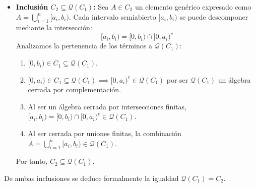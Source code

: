 \begin{problema}
\begin{enumerate}[label=\alph*)]
\begin{itemize}
        \item \textbf{Inclusión $C_2 \subseteq \mathcal{Q}(C_1)$:}
        Sea $A \in C_2$ un elemento genérico expresado como $A = \bigcup_{i=1}^n [a_i, b_i)$.
        Cada intervalo semiabierto $[a_i, b_i)$ se puede descomponer mediante la intersección:
        \[
            [a_i, b_i) = [0, b_i) \cap [0, a_i)^c
        \]
        Analizamos la pertenencia de los términos a $\mathcal{Q}(C_1)$:
        \begin{enumerate}[label=\arabic*)]
            \item $[0, b_i) \in C_1 \subseteq \mathcal{Q}(C_1)$.
            \item $[0, a_i) \in C_1 \subseteq \mathcal{Q}(C_1) \implies [0, a_i)^c \in \mathcal{Q}(C_1)$ por ser $\mathcal{Q}(C_1)$ un álgebra cerrada por complementación.
            \item Al ser un álgebra cerrada por intersecciones finitas, $[a_i, b_i) = [0, b_i) \cap [0, a_i)^c \in \mathcal{Q}(C_1)$.
            \item Al ser cerrada por uniones finitas, la combinación $A = \bigcup_{i=1}^n [a_i, b_i) \in \mathcal{Q}(C_1)$.
        \end{enumerate}
        Por tanto, $C_2 \subseteq \mathcal{Q}(C_1)$.
    \end{itemize}
    De ambas inclusiones se deduce formalmente la igualdad $\mathcal{Q}(C_1) = C_2$.
\end{enumerate}
\end{problema}

\newpage

